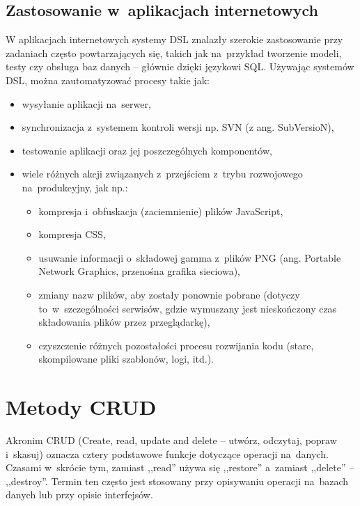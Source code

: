 \documentclass[a4paper,12pt,oneside]{report}
\begin{document}
\subsection{Zastosowanie w~aplikacjach internetowych}
\label{dsl:web}
W aplikacjach internetowych systemy DSL znalazły szerokie zastosowanie przy zadaniach często powtarzających się, takich jak na~przykład tworzenie modeli, testy czy obsługa baz danych -- głównie dzięki językowi SQL. Używając systemów DSL, można zautomatyzować procesy takie jak:
\begin{itemize}
  \item wysyłanie aplikacji na~serwer,
  \item synchronizacja z~systemem kontroli wersji np. SVN (z ang. SubVersioN),
  \item testowanie aplikacji oraz jej poszczególnych komponentów,
  \item wiele różnych akcji związanych z~przejściem z~trybu rozwojowego na~produkcyjny, jak np.:
  \begin{itemize}
    \item kompresja i~obfuskacja (zaciemnienie) plików JavaScript,
    \item kompresja CSS,
    \item usuwanie informacji o~składowej gamma z~plików PNG (ang. Portable Network Graphics, przenośna grafika sieciowa),
    \item zmiany nazw plików, aby zostały ponownie pobrane (dotyczy to~w~szczególności serwisów, gdzie wymuszany jest nieskończony czas składowania plików przez przeglądarkę),
    \item czyszczenie różnych pozostałości procesu rozwijania kodu (stare, skompilowane pliki szablonów, logi, itd.).
  \end{itemize}
\end{itemize}

\section{Metody CRUD}
\label{sec:crud}
Akronim CRUD (Create, read, update and delete -- utwórz, odczytaj, popraw i~skasuj) oznacza cztery podstawowe funkcje dotyczące operacji na~danych. Czasami w~skrócie tym, zamiast ,,read'' używa się ,,restore'' a~zamiast ,,delete'' -- ,,destroy''. Termin ten często jest stosowany przy opisywaniu operacji na~bazach danych lub przy opisie interfejsów.
\end{document}
